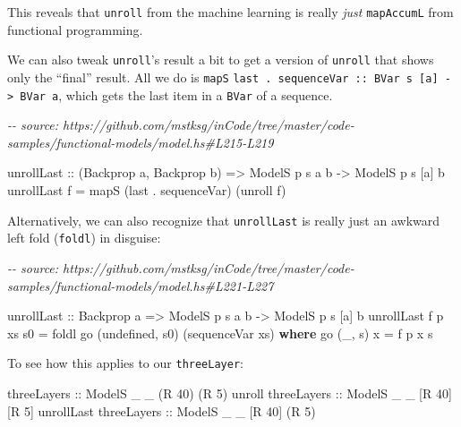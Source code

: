 \documentclass[]{article}
\newenvironment{Shaded}{}{}
\newcommand{\CommentTok}[1]{\textcolor[rgb]{0.38,0.63,0.69}{\textit{#1}}}
\newcommand{\DataTypeTok}[1]{\textcolor[rgb]{0.56,0.13,0.00}{#1}}
\newcommand{\DecValTok}[1]{\textcolor[rgb]{0.25,0.63,0.44}{#1}}
\newcommand{\FunctionTok}[1]{\textcolor[rgb]{0.02,0.16,0.49}{#1}}
\newcommand{\KeywordTok}[1]{\textcolor[rgb]{0.00,0.44,0.13}{\textbf{#1}}}
\newcommand{\NormalTok}[1]{#1}
\newcommand{\OperatorTok}[1]{\textcolor[rgb]{0.40,0.40,0.40}{#1}}
\newcommand{\OtherTok}[1]{\textcolor[rgb]{0.00,0.44,0.13}{#1}}
\begin{document}
This reveals that \texttt{unroll} from the machine learning is really
\emph{just} \texttt{mapAccumL} from functional programming.

We can also tweak \texttt{unroll}'s result a bit to get a version of
\texttt{unroll} that shows only the ``final'' result. All we do is \texttt{mapS}
\texttt{last\ .\ sequenceVar\ ::\ BVar\ s\ {[}a{]}\ -\textgreater{}\ BVar\ a},
which gets the last item in a \texttt{BVar} of a sequence.

\begin{Shaded}
\begin{Highlighting}[]
\CommentTok{{-}{-} source: https://github.com/mstksg/inCode/tree/master/code{-}samples/functional{-}models/model.hs\#L215{-}L219}

\NormalTok{unrollLast}
\OtherTok{    ::}\NormalTok{ (}\DataTypeTok{Backprop}\NormalTok{ a, }\DataTypeTok{Backprop}\NormalTok{ b)}
    \OtherTok{=\textgreater{}} \DataTypeTok{ModelS}\NormalTok{ p s  a  b}
    \OtherTok{{-}\textgreater{}} \DataTypeTok{ModelS}\NormalTok{ p s [a] b}
\NormalTok{unrollLast f }\OtherTok{=}\NormalTok{ mapS (}\FunctionTok{last} \OperatorTok{.}\NormalTok{ sequenceVar) (unroll f)}
\end{Highlighting}
\end{Shaded}

Alternatively, we can also recognize that \texttt{unrollLast} is really just an
awkward left fold (\texttt{foldl}) in disguise:

\begin{Shaded}
\begin{Highlighting}[]
\CommentTok{{-}{-} source: https://github.com/mstksg/inCode/tree/master/code{-}samples/functional{-}models/model.hs\#L221{-}L227}

\NormalTok{unrollLast\textquotesingle{}}
\OtherTok{    ::} \DataTypeTok{Backprop}\NormalTok{ a}
    \OtherTok{=\textgreater{}} \DataTypeTok{ModelS}\NormalTok{ p s  a  b}
    \OtherTok{{-}\textgreater{}} \DataTypeTok{ModelS}\NormalTok{ p s [a] b}
\NormalTok{unrollLast\textquotesingle{} f p xs s0 }\OtherTok{=}\NormalTok{ foldl\textquotesingle{} go (}\FunctionTok{undefined}\NormalTok{, s0) (sequenceVar xs)}
  \KeywordTok{where}
\NormalTok{    go (\_, s) x }\OtherTok{=}\NormalTok{ f p x s}
\end{Highlighting}
\end{Shaded}

To see how this applies to our \texttt{threeLayer}:

\begin{Shaded}
\begin{Highlighting}[]
\OtherTok{threeLayers            ::} \DataTypeTok{ModelS}\NormalTok{ \_ \_ (}\DataTypeTok{R} \DecValTok{40}\NormalTok{) (}\DataTypeTok{R} \DecValTok{5}\NormalTok{)}
\NormalTok{unroll}\OtherTok{     threeLayers ::} \DataTypeTok{ModelS}\NormalTok{ \_ \_ [}\DataTypeTok{R} \DecValTok{40}\NormalTok{] [}\DataTypeTok{R} \DecValTok{5}\NormalTok{]}
\NormalTok{unrollLast}\OtherTok{ threeLayers ::} \DataTypeTok{ModelS}\NormalTok{ \_ \_ [}\DataTypeTok{R} \DecValTok{40}\NormalTok{] (}\DataTypeTok{R} \DecValTok{5}\NormalTok{)}
\end{Highlighting}
\end{Shaded}
\end{document}
